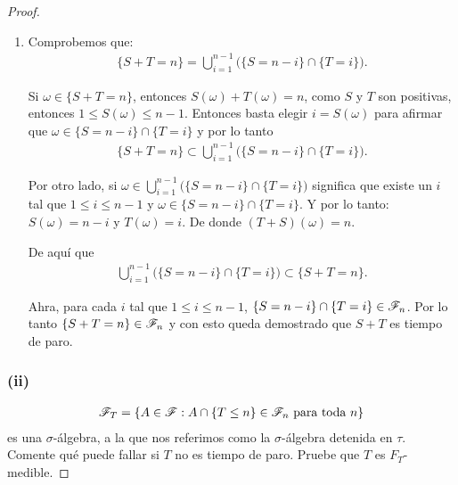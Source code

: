\begin{proof}
\begin{enumerate}
				Por último, $\{ T \leq n \} \in \F_n$ y $\{ S \leq n \} \in \F_n$. Por lo tanto	\\	
				$\{ T \leq n \} \cap \{ S \leq n\} = \{ S \vee T \leq n \} \in \F_n$ y con esto demostramos que 
				$ S \vee T$ es tiempo de paro.\\
				
			\item
				Comprobemos que:
				\begin{align}
					\{ S + T = n \} = \bigcup_{i = 1}^{n-1} \bigg( \{S = n - i\} \cap \{T = i\} \bigg).
				\end{align}
				
				Si $\omega \in \{ S + T = n \}$, entonces $S(\omega) + T(\omega) = n$, como $S$ y $T$ son positivas,
				entonces $1 \leq S(\omega) \leq n-1$. Entonces basta elegir $i = S(\omega)$ para afirmar que 
				$\omega \in \{S = n - i\} \cap \{T = i\}$ y por lo tanto
				\begin{align}
				\{ S + T = n \} \subset \bigcup_{i = 1}^{n-1} \bigg( \{S = n - i\} \cap \{T = i\} \bigg).
				\end{align}
				
				Por otro lado, si $\omega \in \bigcup_{i = 1}^{n-1} \bigg( \{S = n - i\} \cap \{T = i\} \bigg)$
				significa que existe un $i$ tal que $1\leq i \leq n-1$ y $\omega \in \{S = n - i\} \cap \{T = i\}$.
				Y por lo tanto: $S(\omega) = n-i$ y $T(\omega) = i$. De donde $(T + S)(\omega) = n$.
				
				De aquí que
				\begin{align}
					\bigcup_{i = 1}^{n-1} \bigg( \{S = n - i\} \cap \{T = i\} \bigg) \subset \{ S + T = n \}. 
				\end{align}
				
				Ahra, para cada $i$ tal que $1 \leq i \leq n-1$, $\{S = n - i\} \cap \{T = i\} \in \mathscr{F}_n$.
				Por lo tanto $\{ S + T = n\} \in \mathscr{F}_n$ y con esto queda demostrado que $ S + T $ es tiempo de paro.
		\end{enumerate}
		
	\subsubsection{(ii)}
		\begin{align}
			\mathscr{F}_T=\left\{ A\in\mathscr{F}:A\cap\left\{ T\leq n\right\} \in\mathscr{F}_n\text{ para toda } n\right\} 
		\end{align}
		es una $\sigma$-\'algebra, 
		a la que nos referimos como la $\sigma$-\'algebra detenida en $\tau$. Comente qu\'e puede fallar si $T$ no es tiempo de paro. 
		Pruebe que $T$ es $F_T$-medible. 
	

\end{proof}
